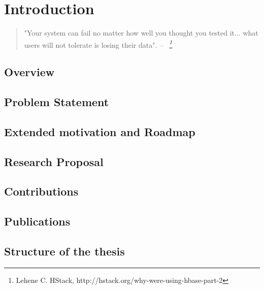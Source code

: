 \chapter{Introduction}\label{ch:intro}

\begin{quotation}
"Your system can fail no matter how well you thought you tested it... what users will not tolerate is losing their data".
{\small\it -- ~\footnote{Lehene C. HStack, http://hstack.org/why-were-using-hbase-part-2} }
\end{quotation}


\section{Overview}


\section{Problem Statement}


\section{Extended motivation and Roadmap}


\section{Research Proposal}


\section{Contributions}


\section{Publications}


\section{Structure of the thesis}

